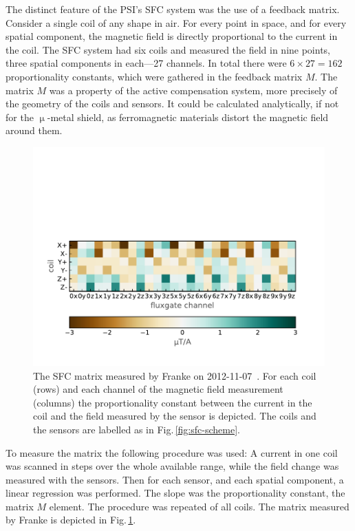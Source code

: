 The distinct feature of the PSI's SFC system was the use of a feedback matrix. Consider a single coil of any shape in air. For every point in space, and for every spatial component, the magnetic field is directly proportional to the current in the coil. The SFC system had six coils and measured the field in nine points, three spatial components in each---27 channels. In total there were $6 \times 27 = 162$ proportionality constants, which were gathered in the feedback matrix $M$. The matrix $M$ was a property of the active compensation system, more precisely of the geometry of the coils and sensors. It could be calculated analytically, if not for the $\upmu$-metal shield, as ferromagnetic materials distort the magnetic field around them.



\begin{figure}
  \centering
  \includegraphics[width=.8\linewidth]{gfx/nEDM_SFC/nEDM_SFC_matrix}
  \caption{The SFC matrix measured by Franke on 2012-11-07~\cite{Franke2013}. For each coil (rows) and each channel of the magnetic field measurement (columns) the proportionality constant between the current in the coil and the field measured by the sensor is depicted. The coils and the sensors are labelled as in Fig.\,\ref{fig:sfc-scheme}.}
  \label{fig:nEDM_SFC_matrix}
\end{figure}

To measure the matrix the following procedure was used: A current in one coil was scanned in steps over the whole available range, while the field change was measured with the sensors. Then for each sensor, and each spatial component, a linear regression was performed. The slope was the proportionality constant, the matrix $M$ element. The procedure was repeated of all coils. The matrix measured by Franke is depicted in Fig.\,\ref{fig:nEDM_SFC_matrix}.

